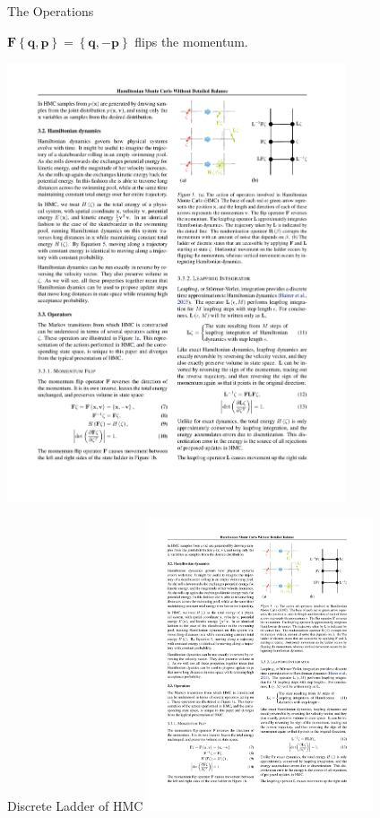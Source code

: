 \documentclass{beamer}
\renewcommand{\vec}[1]{\ensuremath{\mathbf{#1}}}
\newcommand{\op}[1]{\ensuremath{\mathbf{#1}}}
\begin{document}
    \begin{frame}{The Operations}

        \begin{definition}
            $\op{F}\left\{\vec{q},\vec{p}\right\} = \left\{\vec{q},-\vec{p}\right\}$ flips the momentum.
        \end{definition}

        \vfill

        \centering
        \includegraphics[width=0.75\textwidth]{F.pdf}

    \end{frame}

    \begin{frame}{Discrete Ladder of HMC}
        \centering
        \includegraphics[width=0.5\textwidth]{ladder.pdf}
    \end{frame}
\end{document}
